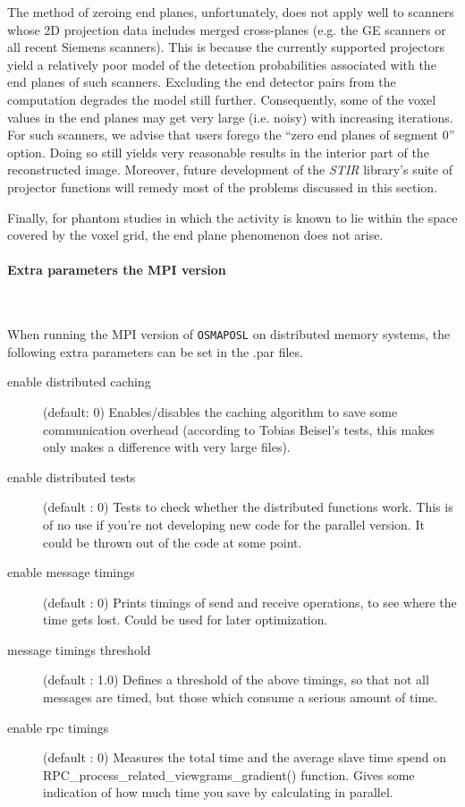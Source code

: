\documentclass{article}
\newcommand{\subsubsubsection}[1]{\paragraph{#1}\mbox{} \\}
\begin{document}
The method of zeroing end planes, unfortunately, does not apply 
well to scanners whose 2D projection data includes merged cross-planes 
(e.g. the GE scanners or all recent Siemens scanners). 
This is because the currently supported 
projectors yield a relatively poor model of the detection probabilities 
associated with the end planes of such scanners. Excluding the 
end detector pairs from the computation degrades the model still 
further. Consequently, some of the voxel values in the end planes 
may get very large (i.e. noisy) with increasing iterations. For such scanners, we 
advise that users forego the ``zero end planes of segment 0'' 
option. Doing so still yields very reasonable results in the 
interior part of the reconstructed image. Moreover, future development 
of the \textit{STIR} library's suite of projector functions will remedy 
most of the problems discussed in this section.


Finally, for phantom studies in which the activity is known to 
lie within the space covered by the voxel grid, the end plane 
phenomenon does not arise.

{\subsubsubsection{Extra parameters the MPI version}}
When running the MPI version of \texttt{OSMAPOSL} on distributed memory
systems, the following extra parameters can be set in the .par files.

\begin{description}
\item[enable distributed caching] (default: 0)
Enables/disables the caching algorithm to save some communication overhead (according
to Tobias Beisel's tests, this makes only makes a difference with very large files). 

\item[enable distributed tests] (default : 0)
Tests to check whether the distributed functions work. This is of no use if you're 
not developing new code for the parallel version. It could be thrown out of the code at some point.

\item[enable message timings] (default : 0)
Prints timings of send and receive operations, to see where the time gets lost. 
Could be used for later optimization. 

\item[message timings threshold] (default : 1.0)
Defines a threshold of the above timings, so that not all messages are timed, but those which 
consume a serious amount of time. 

\item[enable rpc timings] (default : 0)
Measures the total time and the average slave time spend on RPC\_process\_related\_viewgrams\_gradient() function. 
Gives some indication of how much time you save by calculating in parallel. 
\end{description}
\end{document}
